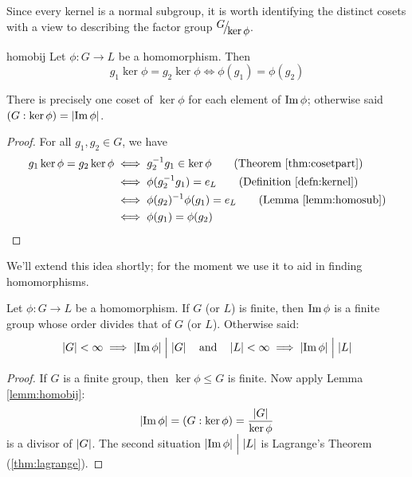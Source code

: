 Since every kernel is a normal subgroup, it is worth identifying the distinct cosets with a view to describing the factor group $\quotient G{\ker\phi}$.

\begin{lemm}{}{homobij}
	Let $\phi:G\to L$ be a homomorphism. Then
	\[
		g_1\ker\phi=g_2\ker\phi
		\iff \phi(g_1)=\phi(g_2)
	\]
\end{lemm}

There is precisely one coset of $\ker\phi$ for each element of $\operatorname{Im}\phi$; otherwise said $(G:\ker\phi)=\left| \operatorname{Im}\phi\right|$.

\begin{proof}
	For all $g_1,g_2\in G$, we have
	\begin{align*}
		g_1\ker\phi=g_2\ker\phi&\iff g_2^{-1}g_1\in\ker\phi \tag{Theorem \ref{thm:cosetpart}}\\
		&\iff\phi(g_2^{-1}g_1)=e_L\tag{Definition \ref{defn:kernel}}\\
		&\iff \phi(g_2)^{-1}\phi(g_1)=e_L\tag{Lemma \ref{lemm:homosub}}\\
		&\iff \phi(g_1)=\phi(g_2)\tag*{\qedhere}
	\end{align*}
\end{proof}

We'll extend this idea shortly; for the moment we use it to aid in finding homomorphisms.

\begin{thm}{}{}
	Let $\phi:G\to L$ be a homomorphism. If $G$ (or $L$) is finite, then $\operatorname{Im}\phi$ is a finite group whose order divides that of $G$ (or $L$). Otherwise said:
	\[
		\left| G\right|<\infty
		\implies\left| \operatorname{Im}\phi\right|\Bigm| \left| G\right|
		\quad\text{and}\quad 
		\left| L\right|<\infty\implies\left| \operatorname{Im}\phi\right|\Bigm| \left| L\right|
	\]
\end{thm}

\begin{proof}
	If $G$ is a finite group, then $\ker\phi\le G$ is finite. Now apply Lemma \ref{lemm:homobij}:
	\[
		\left| \operatorname{Im}\phi\right|=(G:\ker\phi) =\smash[b]{\frac{\left| G\right|}{\ker\phi}}
	\]
	is a divisor of $\left| G\right|$. The second situation $\left| \operatorname{Im}\phi\right|\Bigm|\left| L\right|$ is Lagrange's Theorem (\ref{thm:lagrange}).
\end{proof}



